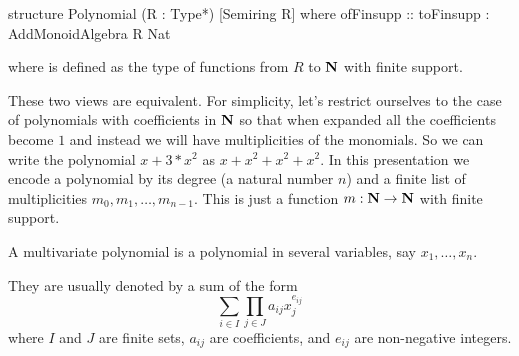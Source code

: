 \begin{LeanCode}
  structure Polynomial (R : Type*) [Semiring R] where ofFinsupp ::
  toFinsupp : AddMonoidAlgebra R Nat
\end{LeanCode}

where  is defined as the type  of functions from $R$ to $\mathbf{N}$ with finite support.

These two views are equivalent. For simplicity, let's restrict ourselves to the case of polynomials with coefficients in $\mathbf{N}$ so that when expanded all the coefficients become $1$ and instead we will have multiplicities of the monomials. So we can write the polynomial $x + 3 * x^2 $ as $x + x^2 + x^2 + x^2$. In this presentation we encode a polynomial by its degree (a natural number $n$) and a finite list of multiplicities $m_0, m_1, \ldots, m_{n - 1}$. This is just a function $m : \mathbf{N} \to \mathbf{N}$ with finite support.



A multivariate polynomial is a polynomial in several variables, say $x_1, \ldots, x_n$.






They are usually denoted by a sum of the form
$$\sum_{i \in I} \prod_{j \in J} a_{ij} x_j^{e_{ij}}$$
where $I$ and $J$ are finite sets, $a_{ij}$ are coefficients, and $e_{ij}$ are non-negative integers.
